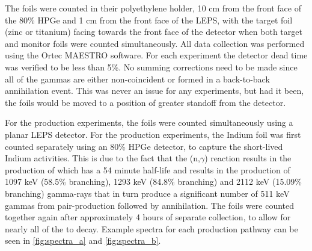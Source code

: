 \documentclass[5p]{elsarticle}
\newcommand{\comment}[1]{\todo[color=blue!20!white,inline]{ASV: #1}}
\begin{document}
% 

The foils were counted in their polyethylene holder, 10 cm from the front face of the 80\% HPGe and 1 cm from the front face of the LEPS, with the target foil (zinc or titanium) facing towards the front face of the detector when both target and monitor foils were counted simultaneously. All data collection was performed using the Ortec MAESTRO software. For each experiment the detector dead time was verified to be less than 5\%.  No summing corrections need to be made since all of the gammas are either non-coincident or formed in a back-to-back annihilation event. This was never an issue for any experiments, but had it been, the foils would be moved to a position of greater standoff from the detector.  

For the   production experiments, the foils were counted simultaneously using a planar LEPS detector. For the  production experiments, the Indium foil was first counted separately using an 80\% HPGe detector, to capture the short-lived Indium activities. This is due to the fact that the (n,$\gamma$) reaction results in the production of  which has a 54 minute half-life and results in the production of 1097 keV (58.5\% branching), 1293 keV (84.8\% branching) and 2112 keV (15.09\% branching) gamma-rays that in turn produce a significant number of 511 keV gammas from pair-production followed by annihilation. The foils were counted together again after approximately 4 hours of separate collection, to allow for nearly all of the  to decay. Example spectra for each production pathway can be seen in \autoref{fig:spectra_a} and \autoref{fig:spectra_b}.
\end{document}
